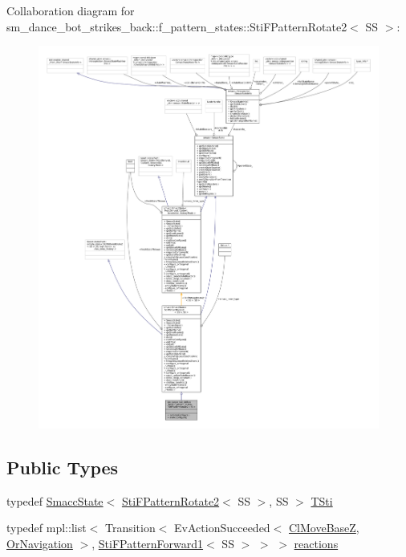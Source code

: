 Collaboration diagram for sm\+\_\+dance\+\_\+bot\+\_\+strikes\+\_\+back\+:\+:f\+\_\+pattern\+\_\+states\+:\+:Sti\+F\+Pattern\+Rotate2$<$ SS $>$\+:
\nopagebreak
\begin{figure}[H]
\begin{center}
\leavevmode
\includegraphics[width=350pt]{structsm__dance__bot__strikes__back_1_1f__pattern__states_1_1StiFPatternRotate2__coll__graph}
\end{center}
\end{figure}
\subsection*{Public Types}
\begin{DoxyCompactItemize}
\item 
typedef \hyperlink{classSmaccState}{Smacc\+State}$<$ \hyperlink{structsm__dance__bot__strikes__back_1_1f__pattern__states_1_1StiFPatternRotate2}{Sti\+F\+Pattern\+Rotate2}$<$ SS $>$, SS $>$ \hyperlink{structsm__dance__bot__strikes__back_1_1f__pattern__states_1_1StiFPatternRotate2_aed3f2c5cc7b21876329a8767f46d14a3}{T\+Sti}
\item 
typedef mpl\+::list$<$ Transition$<$ Ev\+Action\+Succeeded$<$ \hyperlink{classcl__move__base__z_1_1ClMoveBaseZ}{Cl\+Move\+BaseZ}, \hyperlink{classsm__dance__bot__strikes__back_1_1OrNavigation}{Or\+Navigation} $>$, \hyperlink{structsm__dance__bot__strikes__back_1_1f__pattern__states_1_1StiFPatternForward1}{Sti\+F\+Pattern\+Forward1}$<$ SS $>$ $>$ $>$ \hyperlink{structsm__dance__bot__strikes__back_1_1f__pattern__states_1_1StiFPatternRotate2_acbf56310baa77fbcd80a7648ace4879e}{reactions}
\end{DoxyCompactItemize}
